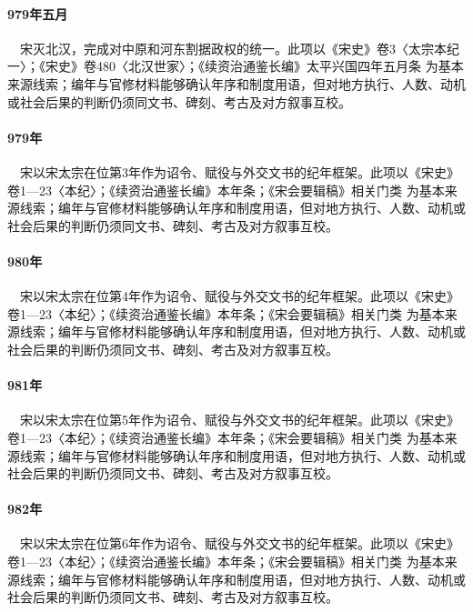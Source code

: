\paragraph{979年五月}　宋灭北汉，完成对中原和河东割据政权的统一。此项以《宋史》卷3〈太宗本纪一〉；《宋史》卷480〈北汉世家〉；《续资治通鉴长编》太平兴国四年五月条 为基本来源线索；编年与官修材料能够确认年序和制度用语，但对地方执行、人数、动机或社会后果的判断仍须同文书、碑刻、考古及对方叙事互校。

\paragraph{979年}　宋以宋太宗在位第3年作为诏令、赋役与外交文书的纪年框架。此项以《宋史》卷1—23〈本纪〉；《续资治通鉴长编》本年条；《宋会要辑稿》相关门类 为基本来源线索；编年与官修材料能够确认年序和制度用语，但对地方执行、人数、动机或社会后果的判断仍须同文书、碑刻、考古及对方叙事互校。

\paragraph{980年}　宋以宋太宗在位第4年作为诏令、赋役与外交文书的纪年框架。此项以《宋史》卷1—23〈本纪〉；《续资治通鉴长编》本年条；《宋会要辑稿》相关门类 为基本来源线索；编年与官修材料能够确认年序和制度用语，但对地方执行、人数、动机或社会后果的判断仍须同文书、碑刻、考古及对方叙事互校。

\paragraph{981年}　宋以宋太宗在位第5年作为诏令、赋役与外交文书的纪年框架。此项以《宋史》卷1—23〈本纪〉；《续资治通鉴长编》本年条；《宋会要辑稿》相关门类 为基本来源线索；编年与官修材料能够确认年序和制度用语，但对地方执行、人数、动机或社会后果的判断仍须同文书、碑刻、考古及对方叙事互校。

\paragraph{982年}　宋以宋太宗在位第6年作为诏令、赋役与外交文书的纪年框架。此项以《宋史》卷1—23〈本纪〉；《续资治通鉴长编》本年条；《宋会要辑稿》相关门类 为基本来源线索；编年与官修材料能够确认年序和制度用语，但对地方执行、人数、动机或社会后果的判断仍须同文书、碑刻、考古及对方叙事互校。

